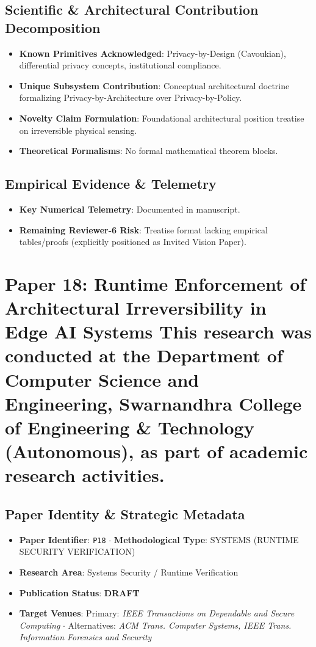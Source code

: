 \documentclass[11pt,a4paper]{article}
\begin{document}
\subsection*{Scientific & Architectural Contribution Decomposition}
\begin{itemize}[leftmargin=1.5em, itemsep=0.2em]
    \item \textbf{Known Primitives Acknowledged}: Privacy-by-Design (Cavoukian), differential privacy concepts, institutional compliance.
    \item \textbf{Unique Subsystem Contribution}: Conceptual architectural doctrine formalizing Privacy-by-Architecture over Privacy-by-Policy.
    \item \textbf{Novelty Claim Formulation}: Foundational architectural position treatise on irreversible physical sensing.
    \item \textbf{Theoretical Formalisms}: No formal mathematical theorem blocks.
\end{itemize}

\subsection*{Empirical Evidence & Telemetry}
\begin{itemize}[leftmargin=1.5em, itemsep=0.2em]
    \item \textbf{Key Numerical Telemetry}: Documented in manuscript.
    \item \textbf{Remaining Reviewer-6 Risk}: Treatise format lacking empirical tables/proofs (explicitly positioned as Invited Vision Paper).
\end{itemize}

\section{Paper 18: Runtime Enforcement of Architectural Irreversibility in Edge AI Systems This research was conducted at the Department of Computer Science and Engineering, Swarnandhra College of Engineering \& Technology (Autonomous), as part of academic research activities.}

\subsection*{Paper Identity \& Strategic Metadata}
\begin{itemize}[leftmargin=1.5em, itemsep=0.2em]
    \item \textbf{Paper Identifier}: \texttt{P18} $\cdot$ \textbf{Methodological Type}: SYSTEMS (RUNTIME SECURITY VERIFICATION)
    \item \textbf{Research Area}: Systems Security / Runtime Verification
    \item \textbf{Publication Status}: \textbf{DRAFT}
    \item \textbf{Target Venues}: Primary: \textit{IEEE Transactions on Dependable and Secure Computing} $\cdot$ Alternatives: \textit{ACM Trans. Computer Systems, IEEE Trans. Information Forensics and Security}
\end{itemize}
\end{document}
